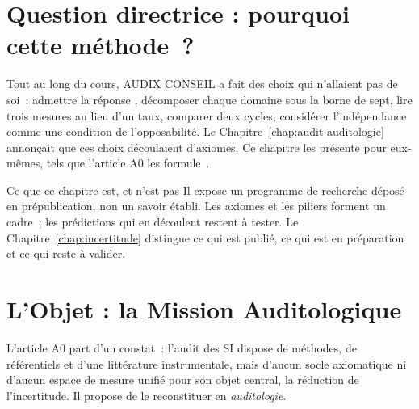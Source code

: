 \bigskip

\section*{Question directrice : pourquoi cette méthode~?}

Tout au long du cours, AUDIX CONSEIL a fait des choix qui n'allaient pas de
soi~: admettre la réponse \NEK{}, décomposer chaque domaine sous la borne de
sept, lire trois mesures au lieu d'un taux, comparer deux cycles,
considérer l'indépendance comme une condition de l'opposabilité. Le
Chapitre~\ref{chap:audit-auditologie} annonçait que ces choix découlaient
d'axiomes. Ce chapitre les présente pour eux-mêmes, tels que l'article A0
les formule~\cite{minka2026auditologie}.

\begin{boiteRemarque}{Ce que ce chapitre est, et n'est pas}
Il expose un programme de recherche déposé en prépublication, non un
savoir établi. Les axiomes et les piliers forment un cadre~; les
prédictions qui en découlent restent à tester. Le
Chapitre~\ref{chap:incertitude} distingue ce qui est publié, ce qui est en
préparation et ce qui reste à valider.
\end{boiteRemarque}

\separateur

\section{L'Objet : la Mission Auditologique}
\label{sec:c21-objet}

L'article A0 part d'un constat~: l'audit des SI dispose de méthodes,
de référentiels et d'une littérature instrumentale, mais d'aucun socle
axiomatique ni d'aucun espace de mesure unifié pour son objet central, la
réduction de l'incertitude. Il propose de le reconstituer en
\emph{auditologie}.

